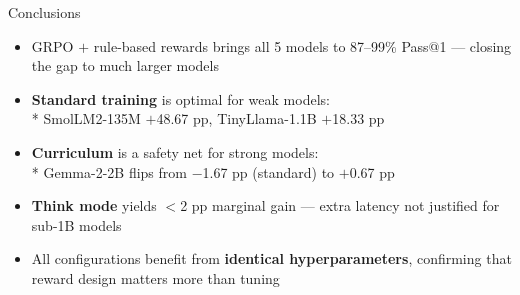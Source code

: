 \documentclass[10pt, aspectratio=169]{beamer}
\begin{document}
\begin{frame}{Conclusions}
  \begin{itemize}
    \setlength\itemsep{0.65em}
    \item GRPO $+$ rule-based rewards brings all 5 models to
          \alert{87–99\% Pass@1} — closing the gap to much larger models
    \item \textbf{Standard training} is optimal for weak models:\\*
          SmolLM2-135M $+$48.67 pp, TinyLlama-1.1B $+$18.33 pp
    \item \textbf{Curriculum} is a safety net for strong models:\\*
          Gemma-2-2B flips from $-$1.67 pp (standard) to $+$0.67 pp
    \item \textbf{Think mode} yields $<$2 pp marginal gain —
          extra latency not justified for sub-1B models
    \item All configurations benefit from \textbf{identical hyperparameters},
          confirming that reward design matters more than tuning
  \end{itemize}
\end{frame}
\end{document}
